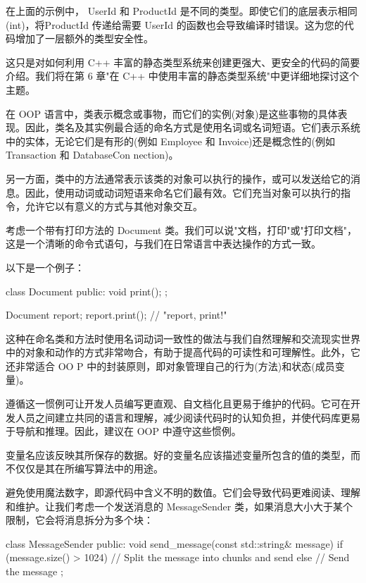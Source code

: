 在上面的示例中， UserId 和 ProductId 是不同的类型。即使它们的底层表示相同(int)，将ProductId 传递给需要 UserId 的函数也会导致编译时错误。这为您的代码增加了一层额外的类型安全性。

这只是对如何利用 C++ 丰富的静态类型系统来创建更强大、更安全的代码的简要介绍。我们将在第 6 章"在 C++ 中使用丰富的静态类型系统"中更详细地探讨这个主题。


在 OOP 语言中，类表示概念或事物，而它们的实例(对象)是这些事物的具体表现。因此，类名及其实例最合适的命名方式是使用名词或名词短语。它们表示系统中的实体，无论它们是有形的(例如 Employee 和 Invoice)还是概念性的(例如 Transaction 和 DatabaseCon nection)。

另一方面，类中的方法通常表示该类的对象可以执行的操作，或可以发送给它的消息。因此，使用动词或动词短语来命名它们最有效。它们充当对象可以执行的指令，允许它以有意义的方式与其他对象交互。

考虑一个带有打印方法的 Document 类。我们可以说"文档，打印"或"打印文档"，这是一个清晰的命令式语句，与我们在日常语言中表达操作的方式一致。

以下是一个例子：

\begin{cpp}
class Document {
public:
    void print();
};

Document report;
report.print(); // "report, print!"
\end{cpp}

这种在命名类和方法时使用名词动词一致性的做法与我们自然理解和交流现实世界中的对象和动作的方式非常吻合，有助于提高代码的可读性和可理解性。此外，它还非常适合 OO P 中的封装原则，即对象管理自己的行为(方法)和状态(成员变量)。

遵循这一惯例可让开发人员编写更直观、自文档化且更易于维护的代码。它可在开发人员之间建立共同的语言和理解，减少阅读代码时的认知负担，并使代码库更易于导航和推理。因此，建议在 OOP 中遵守这些惯例。


变量名应该反映其所保存的数据。好的变量名应该描述变量所包含的值的类型，而不仅仅是其在所编写算法中的用途。

避免使用魔法数字，即源代码中含义不明的数值。它们会导致代码更难阅读、理解和维护。让我们考虑一个发送消息的 MessageSender 类，如果消息大小大于某个限制，它会将消息拆分为多个块：

\begin{cpp}
class MessageSender {
public:
    void send_message(const std::string& message) {
        if (message.size() > 1024) {
            // Split the message into chunks and send
        } else {
            // Send the message
        }
    }
};
\end{cpp}

